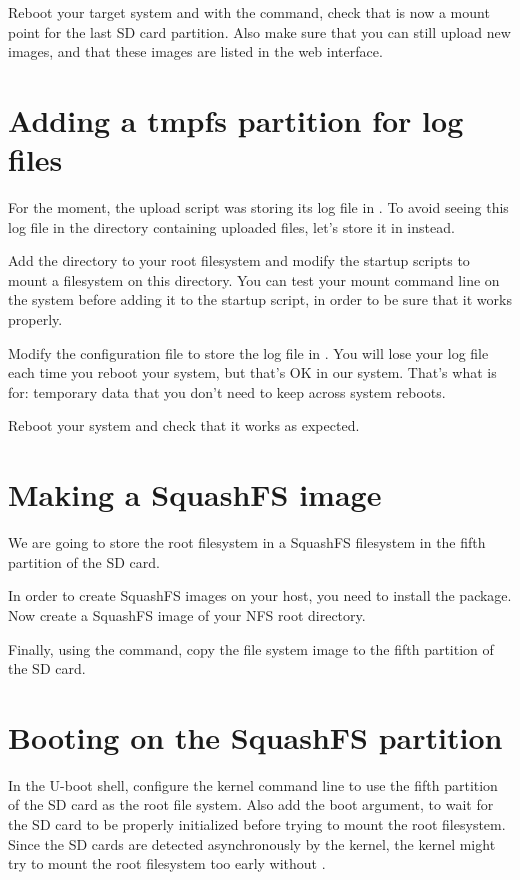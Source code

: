 Reboot your target system and with the  command, check that
 is now a mount point for the last SD card
partition. Also make sure that you can still upload new images, and
that these images are listed in the web interface.

\section{Adding a tmpfs partition for log files}

For the moment, the upload script was storing its log file in
. To avoid seeing this log file in
the directory containing uploaded files, let's store it in
 instead.

Add the  directory to your root filesystem and modify
the startup scripts to mount a  filesystem on this
directory. You can test your  mount command line on the
system before adding it to the startup script, in order to be sure
that it works properly.

Modify the  configuration file to store
the log file in . You will lose your log
file each time you reboot your system, but that's OK in our
system. That's what  is for: temporary data that you don't need
to keep across system reboots.

Reboot your system and check that it works as expected.

\section{Making a SquashFS image}

We are going to store the root filesystem in a SquashFS filesystem in
the fifth partition of the SD card.

In order to create SquashFS images on your host, you need to install
the  package. Now create a SquashFS image of your
NFS root directory.

Finally, using the  command, copy the file system image to
the fifth partition of the SD card.

\section{Booting on the SquashFS partition}

In the U-boot shell, configure the kernel command line to use the
fifth partition of the SD card as the root file system. Also add the
 boot argument, to wait for the SD card to be properly
initialized before trying to mount the root filesystem. Since the SD
cards are detected asynchronously by the kernel, the kernel might try
to mount the root filesystem too early without .

